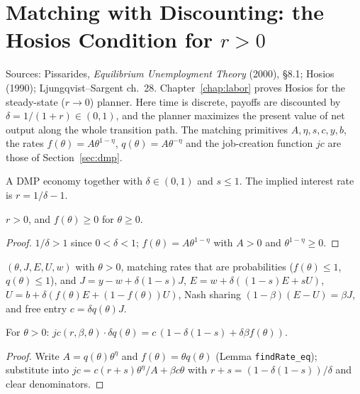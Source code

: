 \chapter{Matching with Discounting: the Hosios Condition for $r > 0$}
\label{chap:hosios_discounted}

Sources: Pissarides, \emph{Equilibrium Unemployment Theory} (2000), \S8.1; Hosios (1990); Ljungqvist--Sargent
ch.~28. Chapter~\ref{chap:labor} proves Hosios for the steady-state ($r \to 0$) planner. Here time is discrete,
payoffs are discounted by $\delta = 1/(1+r) \in (0,1)$, and the planner maximizes the present value of net output
along the whole transition path. The matching primitives $A, \eta, s, c, y, b$, the rates
$f(\theta) = A\theta^{1-\eta}$, $q(\theta) = A\theta^{-\eta}$ and the job-creation function $jc$ are those of
Section~\ref{sec:dmp}.

\begin{definition}
\label{def:hd_economy}
\leanok
{}
A DMP economy together with $\delta \in (0,1)$ and $s \le 1$. The implied interest rate is $r = 1/\delta - 1$.
\end{definition}

\begin{lemma}
\label{lem:hd_basic}
\leanok
{}
$r > 0$, and $f(\theta) \ge 0$ for $\theta \ge 0$.
\end{lemma}
\begin{proof}
\leanok
$1/\delta > 1$ since $0 < \delta < 1$; $f(\theta) = A\theta^{1-\eta}$ with $A > 0$ and $\theta^{1-\eta} \ge 0$.
\end{proof}

\begin{definition}
\label{def:hd_searchEqm}
\leanok
{}
$(\theta, J, E, U, w)$ with $\theta > 0$, matching rates that are probabilities ($f(\theta) \le 1$,
$q(\theta) \le 1$), and
$J = y - w + \delta(1-s)J$, $E = w + \delta((1-s)E + sU)$, $U = b + \delta(f(\theta)E + (1 - f(\theta))U)$,
Nash sharing $(1-\beta)(E - U) = \beta J$, and free entry $c = \delta q(\theta) J$.
\end{definition}

\begin{lemma}[Job creation at $r = 1/\delta - 1$]
\label{lem:hd_jc_rate}
\leanok
{}
For $\theta > 0$: $jc(r, \beta, \theta)\cdot \delta q(\theta) = c\,(1 - \delta(1-s) + \delta\beta f(\theta))$.
\end{lemma}
\begin{proof}
\leanok
Write $A = q(\theta)\theta^\eta$ and $f(\theta) = \theta q(\theta)$ (Lemma \texttt{findRate\_eq}); substitute into
$jc = c(r+s)\theta^\eta/A + \beta c\theta$ with $r + s = (1 - \delta(1-s))/\delta$ and clear denominators.
\end{proof}

